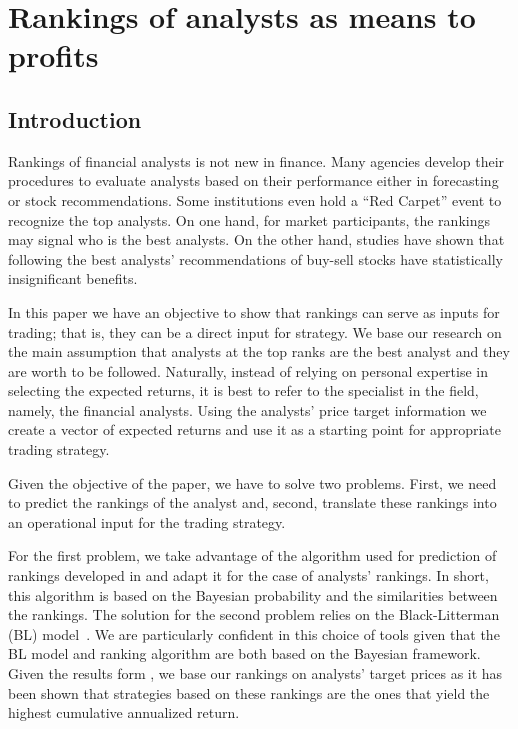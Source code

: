 \documentclass[a4paper,twoside,12pt,openright,notitlepage]{report}\usepackage[]{graphicx}\usepackage[]{color}
\begin{document}
\chapter{Rankings of analysts as means to profits}
\label{ch4}
\begin{abstract}

\end{abstract}








\section{Introduction}
\label{ch4-sec:introduction}


Rankings of financial analysts is not new in finance. Many agencies develop their procedures to evaluate analysts based on their performance either in forecasting or stock recommendations. Some institutions even hold a ``Red Carpet'' event to recognize the top analysts. On one hand, for market participants, the rankings may signal who is the best analysts. On the other hand, studies have shown that following the best analysts' recommendations of buy-sell stocks have statistically insignificant benefits.

In this paper we have an objective to show that rankings can serve as inputs for trading; that is, they can be a direct input for strategy. We base our research on the main assumption that analysts at the top ranks are the best analyst and they are worth to be followed. Naturally, instead of relying on personal expertise in selecting the expected returns, it is best to refer to the specialist in the field, namely, the financial analysts. Using the analysts' price target information we  create a vector of expected returns and use it as a starting point for appropriate trading strategy.

Given the objective of the paper, we have to solve two problems. First, we need to predict the rankings of the analyst and, second, translate these rankings into an operational input for the trading strategy.

For the first problem, we take advantage of the algorithm used for prediction of rankings developed in \cite{aiguzhinov2010} and adapt it for the case of analysts' rankings. In short, this algorithm is based on the Bayesian probability and the similarities between the rankings.
The solution for the second problem relies on the Black-Litterman (BL) model~\citep{black1992}. We are particularly confident in this choice of tools given that the BL model and ranking algorithm are both based on the Bayesian framework. Given the results form \cite{aiguzhinov2015a}, we base our rankings on analysts' target prices as it has been shown that strategies based on these rankings are the ones that yield the highest cumulative annualized return.
\end{document}
